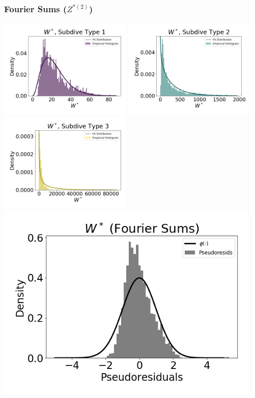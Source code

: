 \documentclass[12pt]{TD-CJS}
\begin{document}
\newpage
\subsubsection{Fourier Sums ($Z^{*(2)}$)}

\includegraphics[width=2.5in]{../Plots/CarHHMM2_empirical_hist_ahat_0.png}
\includegraphics[width=2.5in]{../Plots/CarHHMM2_empirical_hist_ahat_1.png}
\includegraphics[width=2.5in]{../Plots/CarHHMM2_empirical_hist_ahat_2.png}
\includegraphics[width=5in]{../Plots/CarHHMM2_psedoresids_ahat.png}
\end{document}
